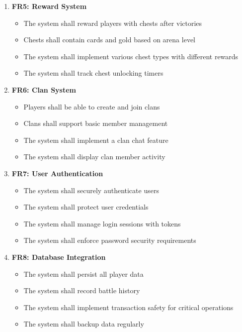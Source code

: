 \documentclass{article}
\begin{document}
\begin{enumerate}
    \item \textbf{FR5: Reward System}
    \begin{itemize}
        \item The system shall reward players with chests after victories
        \item Chests shall contain cards and gold based on arena level
        \item The system shall implement various chest types with different rewards
        \item The system shall track chest unlocking timers
    \end{itemize}

    \item \textbf{FR6: Clan System}
    \begin{itemize}
        \item Players shall be able to create and join clans
        \item Clans shall support basic member management
        \item The system shall implement a clan chat feature
        \item The system shall display clan member activity
    \end{itemize}

    \item \textbf{FR7: User Authentication}
    \begin{itemize}
        \item The system shall securely authenticate users
        \item The system shall protect user credentials
        \item The system shall manage login sessions with tokens
        \item The system shall enforce password security requirements
    \end{itemize}

    \item \textbf{FR8: Database Integration}
    \begin{itemize}
        \item The system shall persist all player data
        \item The system shall record battle history
        \item The system shall implement transaction safety for critical operations
        \item The system shall backup data regularly
    \end{itemize}
\end{enumerate}
\end{document}
